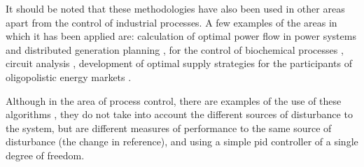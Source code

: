 \begin{refsection}
It should be noted that these methodologies have also been used in other areas apart from the control of industrial processes. A few examples of the areas in which it has been applied are: calculation of optimal power flow in power systems \parencite{Roman2006}  and distributed generation planning \parencite{Zangeneh2007},  for the control of biochemical processes \parencite{Logist2009}, circuit analysis \parencite{Stehr2003}, development of optimal supply strategies for the participants of oligopolistic energy markets \parencite{Vahidinasab2010}.

Although in the area of process control, there are examples of the use of these algorithms \parencite{Gambier2009}, they do not take into account the different sources of disturbance to the system, but are different measures of performance to the same source of disturbance (the change in reference), and using a simple \gls{pid} controller of a single degree of freedom.
\printbibliography
\end{refsection}
